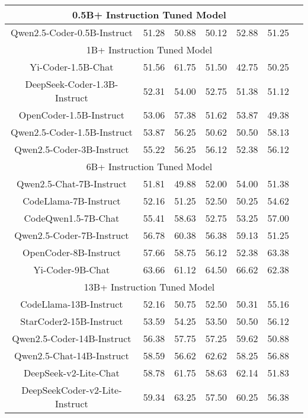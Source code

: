 \documentclass[11pt, a4paper, logo, copyright, nonumbering, amsart]{map}
\begin{document}
\begin{CJK*}{UTF8}{gbsn}
\begin{table*}[h!]
\begin{adjustbox}{width=0.8\textwidth}
\begin{tabular}{c|cccccc}
    \midrule
    \multicolumn{6}{c}{0.5B+ Instruction Tuned Model} \\
    \midrule
    Qwen2.5-Coder-0.5B-Instruct & 51.28 & 50.88 & 50.12 & 52.88 & 51.25 \\
    
    \midrule
    \multicolumn{6}{c}{1B+ Instruction Tuned Model} \\
    \midrule
    Yi-Coder-1.5B-Chat & 51.56 & 61.75 & 51.50 & 42.75 & 50.25 \\
    DeepSeek-Coder-1.3B-Instruct & 52.31 & 54.00 & 52.75 & 51.38 & 51.12 \\
    OpenCoder-1.5B-Instruct & 53.06 & 57.38 & 51.62 & 53.87 & 49.38 \\
    Qwen2.5-Coder-1.5B-Instruct & 53.87 & 56.25 & 50.62 & 50.50 & 58.13 \\
    Qwen2.5-Coder-3B-Instruct & 55.22 & 56.25 & 56.12 & 52.38 & 56.12 \\

    \midrule
    \multicolumn{6}{c}{6B+ Instruction Tuned Model} \\
    \midrule
    Qwen2.5-Chat-7B-Instruct & 51.81 & 49.88 & 52.00 & 54.00 & 51.38 \\
    CodeLlama-7B-Instruct & 52.16 & 51.25 & 52.50 & 50.25 & 54.62 \\
    CodeQwen1.5-7B-Chat & 55.41 & 58.63 & 52.75 & 53.25 & 57.00 \\
    Qwen2.5-Coder-7B-Instruct & 56.78 & 60.38 & 56.38 & 59.13 & 51.25 \\
    OpenCoder-8B-Instruct & 57.66 & 58.75 & 56.12 & 52.38 & 63.38 \\
    Yi-Coder-9B-Chat & 63.66 & 61.12 & 64.50 & 66.62 & 62.38 \\

    \midrule
    \multicolumn{6}{c}{13B+ Instruction Tuned Model} \\
    \midrule
    CodeLlama-13B-Instruct & 52.16 & 50.75 & 52.50 & 50.31 & 55.16 \\
    StarCoder2-15B-Instruct & 53.59 & 54.25 & 53.50 & 50.50 & 56.12 \\
    Qwen2.5-Coder-14B-Instruct & 56.38 & 57.75 & 57.25 & 59.62 & 50.88 \\
    Qwen2.5-Chat-14B-Instruct & 58.59 & 56.62 & 62.62 & 58.25 & 56.88 \\
    DeepSeek-v2-Lite-Chat & 58.78 & 61.75 & 58.63 & 62.14 & 51.83 \\
    DeepSeekCoder-v2-Lite-Instruct & 59.34 & 63.25 & 57.50 & 60.25 & 56.38 \\


\end{tabular}
\end{adjustbox}
\end{table*}
\end{CJK*}
\end{document}
